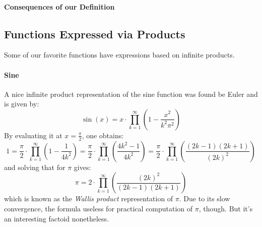 \paragraph{Consequences of our Definition}





\subsection{Functions Expressed via Products}
Some of our favorite functions have expressions based on infinite products. 


\paragraph{Sine}
A nice infinite product representation of the sine function was found be Euler and is given by:
\begin{equation}
 \sin(x) = x \cdot \prod_{k=1}^{\infty} \left( 1 - \frac{x^2}{k^2 \pi^2}  \right)
\end{equation}
By evaluating it at $x = \frac{\pi}{2}$, one obtains:
\begin{equation}
 1 = \frac{\pi}{2} \cdot \prod_{k=1}^{\infty} \left( 1 - \frac{1}{4 k^2}  \right)
   = \frac{\pi}{2} \cdot \prod_{k=1}^{\infty} \left( \frac{4 k^2 - 1}{4 k^2}  \right)
   = \frac{\pi}{2} \cdot \prod_{k=1}^{\infty} \left( \frac{(2k-1)(2k+1)}{(2k)^2}  \right)   
\end{equation}
and solving that for $\pi$ gives:
\begin{equation}
\pi = 2 \cdot \prod_{k=1}^{\infty} \left( \frac{(2k)^2 }{(2k-1)(2k+1)} \right)   
\end{equation}
which is known as the \emph{Wallis product} representation of $\pi$. Due to its slow convergence, the formula useless for practical computation of $\pi$, though. But it's an interesting factoid nonetheless.

